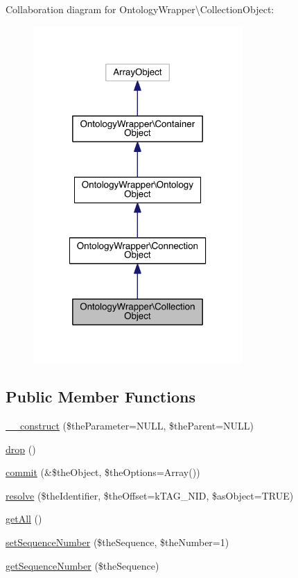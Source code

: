 Collaboration diagram for Ontology\-Wrapper\textbackslash{}Collection\-Object\-:\nopagebreak
\begin{figure}[H]
\begin{center}
\leavevmode
\includegraphics[width=226pt]{class_ontology_wrapper_1_1_collection_object__coll__graph}
\end{center}
\end{figure}
\subsection*{Public Member Functions}
\begin{DoxyCompactItemize}
\item 
\hyperlink{class_ontology_wrapper_1_1_collection_object_a293d59b759d71c809a626cfd5371240f}{\-\_\-\-\_\-construct} (\$the\-Parameter=N\-U\-L\-L, \$the\-Parent=N\-U\-L\-L)
\item 
\hyperlink{class_ontology_wrapper_1_1_collection_object_aee9026b21f08ac0fcfb16f093a9f3235}{drop} ()
\item 
\hyperlink{class_ontology_wrapper_1_1_collection_object_a5cfdfec26ddd9919c1dbabeb2c103a43}{commit} (\&\$the\-Object, \$the\-Options=Array())
\item 
\hyperlink{class_ontology_wrapper_1_1_collection_object_a2e6eea553a4b562445ca2959df8d170c}{resolve} (\$the\-Identifier, \$the\-Offset=k\-T\-A\-G\-\_\-\-N\-I\-D, \$as\-Object=T\-R\-U\-E)
\item 
\hyperlink{class_ontology_wrapper_1_1_collection_object_af663744439023bf993774bdca09b3faa}{get\-All} ()
\item 
\hyperlink{class_ontology_wrapper_1_1_collection_object_a0868032610dd81c923f4a887ec46104d}{set\-Sequence\-Number} (\$the\-Sequence, \$the\-Number=1)
\item 
\hyperlink{class_ontology_wrapper_1_1_collection_object_a17487ff9e82b493434a074c787262df0}{get\-Sequence\-Number} (\$the\-Sequence)
\end{DoxyCompactItemize}
